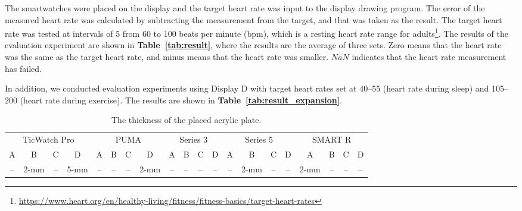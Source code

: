 \documentclass[sigchi,authordraft]{acmart}
\newcommand\tabref[1]{\textbf{Table~\ref{tab:#1}}}
\begin{document}
The smartwatches were placed on the display and the target heart rate was input to the display drawing program. The error of the measured heart rate was calculated by subtracting the measurement from the target, and that was taken as the result. The target heart rate was tested at intervals of 5 from 60 to 100 beats per minute (bpm), which is a resting heart rate range for adults\footnote{\url{https://www.heart.org/en/healthy-living/fitness/fitness-basics/target-heart-rates}}. The results of the evaluation experiment are shown in \tabref{result}, where the results are the average of three sets. Zero means that the heart rate was the same as the target heart rate, and minus means that the heart rate was smaller. $NaN$ indicates that the heart rate measurement has failed.\par

In addition, we conducted evaluation experiments using Display D with target heart rates set at 40--55 (heart rate during sleep) and 105--200 (heart rate during exercise). The results are shown in \tabref{result_expansion}.

\begin{table}[!t]
  \small
  \centering
  \caption{The thickness of the placed acrylic plate.}
  \begin{tabular}{cccc|cccc|cccc|cccc|cccc}
  \toprule
    \multicolumn{4}{c|}{TicWatch Pro}&\multicolumn{4}{c|}{PUMA}&\multicolumn{4}{c|}{Series 3}&\multicolumn{4}{c|}{Series 5}&\multicolumn{4}{c}{SMART R} \\
    A & B & C & D & A & B & C & D & A & B & C & D & A & B & C & D & A & B & C & D \\
    \midrule
    -- & 2-mm & -- & 5-mm & -- & -- & -- & 2-mm & -- & -- & -- & -- & -- & 2-mm & -- & -- & 2-mm & -- & -- & -- \\
    \bottomrule
  \end{tabular}
  \label{tab:acrylic_plate}
\end{table}
\end{document}
